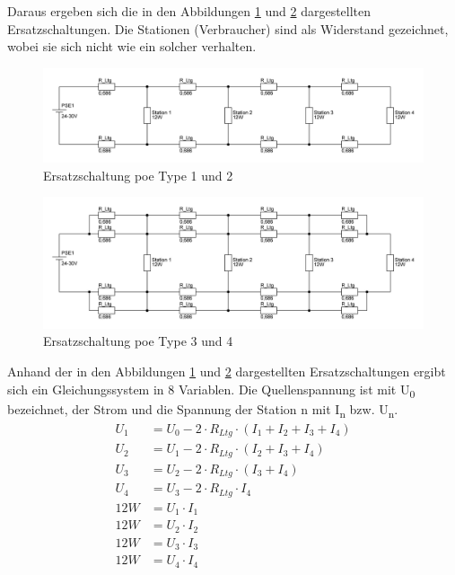 Daraus ergeben sich die in den Abbildungen \ref{fig:ers-type12} und \ref{fig:ers-type34} dargestellten Ersatzschaltungen.
Die Stationen (Verbraucher) sind als Widerstand gezeichnet, wobei sie sich nicht wie ein solcher verhalten.
\begin{figure}[htbp!]
	\centering
	\includegraphics[width=\linewidth]{images/berechnung/poe2pair.png}
	\caption{Ersatzschaltung  \ac{poe} Type 1 und 2}
	\label{fig:ers-type12}
\end{figure}
\begin{figure}[htbp!]
	\centering
	\includegraphics[width=\linewidth]{images/berechnung/poe4pair_neu.jpg}
	\caption{Ersatzschaltung  \ac{poe} Type 3 und 4}
	\label{fig:ers-type34}
\end{figure}

Anhand der in den Abbildungen \ref{fig:ers-type12} und \ref{fig:ers-type34} dargestellten Ersatzschaltungen ergibt sich ein Gleichungssystem in 8 Variablen. Die Quellenspannung ist mit U\textsubscript{0} bezeichnet, der Strom und die Spannung der Station n mit I\textsubscript{n} bzw. U\textsubscript{n}.
\begin{align}
	U_1 &= U_0-2\cdot R_{Ltg}\cdot (I_1+I_2+I_3+I_4)\\
	U_2 &= U_1-2\cdot R_{Ltg}\cdot (I_2+I_3+I_4)\\
	U_3 &= U_2-2\cdot R_{Ltg}\cdot (I_3+I_4)\\
	U_4 &= U_3-2\cdot R_{Ltg}\cdot I_4\\
	12W &= U_1\cdot I_1\\
	12W &= U_2\cdot I_2\\
	12W &= U_3\cdot I_3\\
	12W &= U_4\cdot I_4
\end{align}

